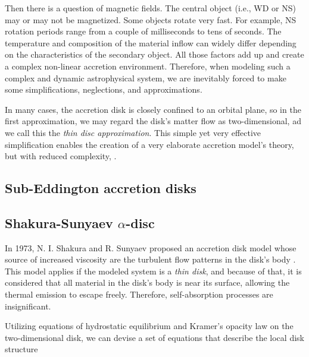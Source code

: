     Then there is a question of magnetic fields. The central object (i.e., WD or NS) may or may not be magnetized. Some objects rotate very fast. For example, NS rotation periods range from a couple of milliseconds to tens of seconds. The temperature and composition of the material inflow can widely differ depending on the characteristics of the secondary object. All those factors add up and create a complex non-linear accretion environment. Therefore, when modeling such a complex and dynamic astrophysical system, we are inevitably forced to make some simplifications, neglections, and approximations. 

    In many cases, the accretion disk is closely confined to an orbital plane, so in the first approximation, we may regard the disk's matter flow as two-dimensional, ad we call this the \emph{thin disc approximation}. This simple yet very effective simplification enables the creation of a very elaborate accretion model's theory, but with reduced complexity, \cite{acpow}.
    

\subsection{Sub-Eddington accretion disks}
    


\subsection[Shakura-Sunyaev $\alpha$-Disc model]{Shakura-Sunyaev $\alpha$-disc}
    In 1973, N. I. Shakura and R. Sunyaev proposed an accretion disk model whose source of increased viscosity are the turbulent flow patterns in the disk's body \cite{shakura1973}. This model applies if the modeled system is a \emph{thin disk}, and because of that, it is considered that all material in the disk's body is near its surface, allowing the thermal emission to escape freely. Therefore, self-absorption processes are insignificant. 

    Utilizing equations of hydrostatic equilibrium and Kramer's opacity law on the two-dimensional disk, we can devise a set of equations that describe the local disk structure \cite{acpow}

